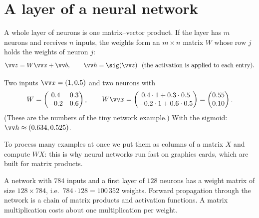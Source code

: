 \section*{A layer of a neural network}
A whole layer of neurons is one matrix--vector product. If the layer has $m$ neurons and receives $n$ inputs, the weights form an $m\times n$ matrix $W$ whose row $j$ holds the weights of neuron $j$:
\[
\vv z=W\vv x+\vv b,\qquad \vv h=\sig(\vv z)\ \ (\text{the activation is applied to each entry}).
\]

\begin{example}
Two inputs $\vv x=(1,0.5)$ and two neurons with
\[
W=\begin{pmatrix}0.4&0.3\\-0.2&0.6\end{pmatrix},\qquad
W\vv x=\begin{pmatrix}0.4\cdot1+0.3\cdot0.5\\-0.2\cdot1+0.6\cdot0.5\end{pmatrix}=\begin{pmatrix}0.55\\0.10\end{pmatrix}.
\]
(These are the numbers of the tiny network example.) With the sigmoid: $\vv h\approx(0.634,0.525)$.
\end{example}

To process many examples at once we put them as columns of a matrix $X$ and compute $WX$: this is why neural networks run fast on graphics cards, which are built for matrix products.

\begin{aibox}
A network with $784$ inputs and a first layer of $128$ neurons has a weight matrix of size $128\times784$, i.e.\ $784\cdot128=100\,352$ weights. Forward propagation through the network is a chain of matrix products and activation functions. A matrix multiplication costs about one multiplication per weight.
\end{aibox}

